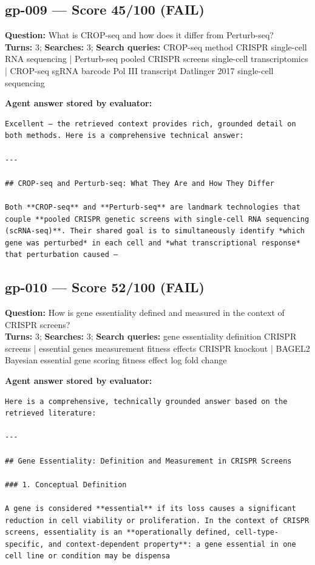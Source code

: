 \documentclass[12pt, a4paper]{article}
\begin{document}
\subsection*{gp-009 --- Score 45/100 (FAIL)}
\noindent\textbf{Question:} What is CROP-seq and how does it differ from Perturb-seq?\\
\textbf{Turns:} 3; \textbf{Searches:} 3; \textbf{Search queries:} CROP-seq method CRISPR single-cell RNA sequencing | Perturb-seq pooled CRISPR screens single-cell transcriptomics | CROP-seq sgRNA barcode Pol III transcript Datlinger 2017 single-cell sequencing

\noindent\textbf{Agent answer stored by evaluator:}
\begin{lstlisting}[numbers=none]
Excellent — the retrieved context provides rich, grounded detail on both methods. Here is a comprehensive technical answer:

---

## CROP-seq and Perturb-seq: What They Are and How They Differ

Both **CROP-seq** and **Perturb-seq** are landmark technologies that couple **pooled CRISPR genetic screens with single-cell RNA sequencing (scRNA-seq)**. Their shared goal is to simultaneously identify *which gene was perturbed* in each cell and *what transcriptional response* that perturbation caused — 
\end{lstlisting}

\subsection*{gp-010 --- Score 52/100 (FAIL)}
\noindent\textbf{Question:} How is gene essentiality defined and measured in the context of CRISPR screens?\\
\textbf{Turns:} 3; \textbf{Searches:} 3; \textbf{Search queries:} gene essentiality definition CRISPR screens | essential genes measurement fitness effects CRISPR knockout | BAGEL2 Bayesian essential gene scoring fitness effect log fold change

\noindent\textbf{Agent answer stored by evaluator:}
\begin{lstlisting}[numbers=none]
Here is a comprehensive, technically grounded answer based on the retrieved literature:

---

## Gene Essentiality: Definition and Measurement in CRISPR Screens

### 1. Conceptual Definition

A gene is considered **essential** if its loss causes a significant reduction in cell viability or proliferation. In the context of CRISPR screens, essentiality is an **operationally defined, cell-type-specific, and context-dependent property**: a gene essential in one cell line or condition may be dispensa
\end{lstlisting}
\end{document}
